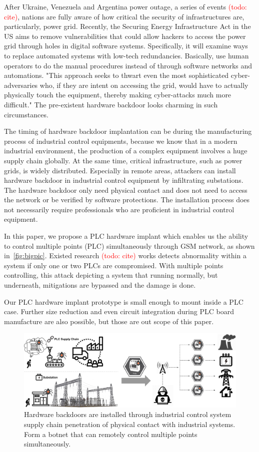 After Ukraine, Venezuela and Argentina power outage, a series of events \textcolor{red}{(todo: cite)}, nations are fully aware of how critical the security of infrastructures are, particularly, power grid. Recently, the Securing Energy Infrastructure Act in the US aims to remove vulnerabilities that could allow hackers to access the power grid through holes in digital software systems. Specifically, it will examine ways to replace automated systems with low-tech redundancies. Basically, use human operators to do the manual procedures instead of through software networks and automations. "This approach seeks to thwart even the most sophisticated cyber-adversaries who, if they are intent on accessing the grid, would have to actually physically touch the equipment, thereby making cyber-attacks much more difficult." The pre-existent hardware backdoor looks charming in such circumstances.

The timing of hardware backdoor implantation can be during the manufacturing process of industrial control equipments, because we know that in a modern industrial environment, the production of a complex equipment involves a huge supply chain globally. At the same time, critical infrastructure, such as power grids, is widely distributed. Especially in remote areas, attackers can install hardware backdoor in industrial control equipment by infiltrating substations. The hardware backdoor only need physical contact and does not need to access the network or be verified by software protections. The installation process does not necessarily require professionals who are proficient in industrial control equipment.

In this paper, we propose a PLC hardware implant which enables us the ability to control multiple points (PLC) simultaneously through GSM network, as shown in~\autoref{fig:bigpic}. Existed research \textcolor{red}{(todo: cite)} works detects abnormality within a system if only one or two PLCs are compromised. With multiple points controlling, this attack depicting a system that running normally, but underneath, mitigations are bypassed and the damage is done.

Our PLC hardware implant prototype is small enough to mount inside a PLC case. Further size reduction and even circuit integration during PLC board manufacture are also possible, but those are out scope of this paper.

\begin{figure}[tp]
	\includegraphics[width=\textwidth]{figures/bigpic}
	\centering
	\caption{Hardware backdoors are installed through industrial control system supply chain penetration of physical contact with industrial systems. Form a botnet that can remotely control multiple points simultaneously.}
	\label{fig:bigpic}
\end{figure}

